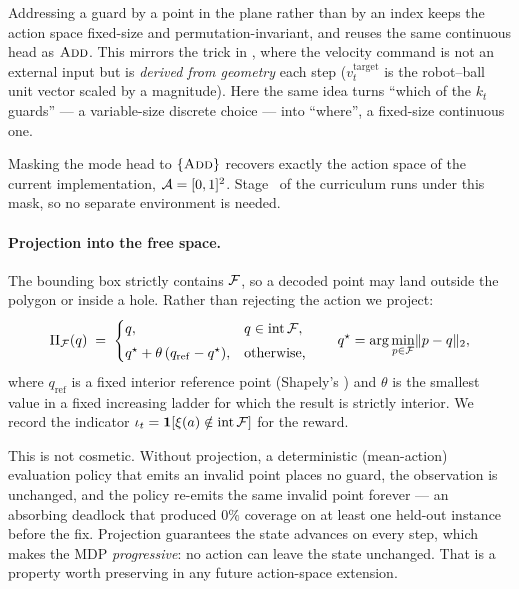 \documentclass[11pt,a4paper]{article}
\begin{document}
\begin{remark}
Addressing a guard by a point in the plane rather than by an index keeps the action space
fixed-size and permutation-invariant, and reuses the same continuous head as $\textsc{Add}$. This
mirrors the trick in \citet{xu2025striker}, where the velocity command is not an external
input but is \emph{derived from geometry} each step ($v^{\mathrm{target}}_t$ is the robot--ball
unit vector scaled by a magnitude). Here the same idea turns ``which of the $k_t$ guards''
--- a variable-size discrete choice --- into ``where'', a fixed-size continuous one.
\end{remark}

\begin{remark}
Masking the mode head to $\{\textsc{Add}\}$ recovers exactly the action space of the current
implementation, $\mathcal{A} = [0,1]^2$. Stage~\stageI{} of the curriculum runs under this
mask, so no separate environment is needed.
\end{remark}

\paragraph{Projection into the free space.}
The bounding box strictly contains $\mathcal{F}$, so a decoded point may land outside the
polygon or inside a hole. Rather than rejecting the action we project:
\begin{equation}\label{eq:proj}
  \Pi_{\mathcal{F}}(q) \;=\;
  \begin{cases}
    q, & q \in \operatorname{int}\mathcal{F}, \\[3pt]
    q^\star + \theta\,(q_{\mathrm{ref}} - q^\star), & \text{otherwise,}
  \end{cases}
  \qquad
  q^\star = \arg\min_{p \in \mathcal{F}}\lVert p - q\rVert_2 ,
\end{equation}
where $q_{\mathrm{ref}}$ is a fixed interior reference point (Shapely's
) and $\theta$ is the smallest value in a fixed increasing
ladder for which the result is strictly interior. We record the indicator
$\iota_t = \mathbf{1}\!\left[\xi(a) \notin \operatorname{int}\mathcal{F}\right]$ for the reward.

This is not cosmetic. Without projection, a deterministic (mean-action) evaluation policy
that emits an invalid point places no guard, the observation is unchanged, and the policy
re-emits the same invalid point forever --- an absorbing deadlock that produced $0\%$
coverage on at least one held-out instance before the fix. Projection guarantees the state
advances on every step, which makes the MDP \emph{progressive}: no action can leave the
state unchanged. That is a property worth preserving in any future action-space extension.
\end{document}
